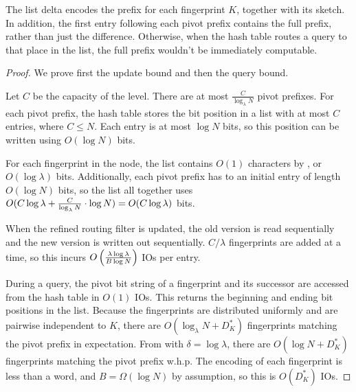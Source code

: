 The list delta encodes the prefix for each fingerprint $K$, together with its
sketch. In addition, the first entry following each pivot prefix contains the
full prefix, rather than just the difference. Otherwise, when the hash table
routes a query to that place in the list, the full prefix wouldn't be
immediately computable.


\begin{proof}
	We prove first the update bound and then the query bound.
	
	Let $C$ be the capacity of the level. There are at most
	$\frac{C}{\log_\lambda N}$ pivot prefixes. For each pivot prefix, the hash
	table stores the bit position in a list with at most $C$ entries, where $C
	\leq N$.  Each entry is at most $\log N$ bits, so this position can be
	written using $O(\log N)$ bits.

	For each fingerprint in the node, the list contains $O(1)$ characters by
	, or $O(\log \lambda)$ bits. Additionally, each
	pivot prefix has to an initial entry of length $O(\log N)$ bits, so the
	list all together uses $O(C\log\lambda + \frac{C}{\log_\lambda N} \cdot
	\log N)= O(C\log\lambda{})$ bits.

	When the refined routing filter is updated, the old version is read
	sequentially and the new version is written out sequentially. $C/\lambda$
	fingerprints are added at a time, so this incurs
	$O\left(\frac{\lambda\log\lambda{}}{B\log N}\right)$ IOs per entry.

	During a query, the pivot bit string of a fingerprint and its successor are
	accessed from the hash table in $O(1)$ IOs. This returns the beginning and
	ending bit positions in the list. Because the fingerprints are distributed
	uniformly and are pairwise independent to $K$, there are $O(\log_\lambda
	N + D_K^*)$ fingerprints matching the pivot prefix in expectation.  From
	 with $\delta=\log\lambda$, there are $O(\log N +
	D_K^*)$ fingerprints matching the pivot prefix w.h.p. The encoding of each
	fingerprint is less than a word, and $B=\Omega(\log N)$ by assumption, so
	this is $O(D_K^*)$ IOs.
\end{proof}

